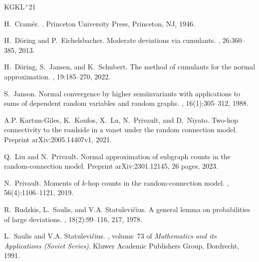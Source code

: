 \documentclass[12pt]{article}
\numberwithin{equation}{section}
\begin{document}
\newcommand{\etalchar}[1]{$^{#1}$}
\def\cprime{$'$} \def\polhk#1{\setbox0=\hbox{#1}{\ooalign{\hidewidth
  \lower1.5ex\hbox{`}\hidewidth\crcr\unhbox0}}}
  \def\polhk#1{\setbox0=\hbox{#1}{\ooalign{\hidewidth
  \lower1.5ex\hbox{`}\hidewidth\crcr\unhbox0}}} \def\cprime{$'$}
\begin{thebibliography}{KGKL{\etalchar{+}}21}

H.~Cram{\'e}r.
.
\newblock Princeton University Press, Princeton, NJ, 1946.

H.~D{\"{o}}ring and P.~Eichelsbacher.
\newblock Moderate deviations via cumulants.
, 26:360--385, 2013.

H.~D{\"o}ring, S.~Jansen, and K.~Schubert.
\newblock The method of cumulants for the normal approximation.
, 19:185--270, 2022.

S.~Janson.
\newblock Normal convergence by higher semiinvariants with applications to sums
  of dependent random variables and random graphs.
, 16(1):305--312, 1988.

\bibitem[KGKL{\etalchar{+}}21]{giles-privault2}
A.P. Kartun-Giles, K.~Koufos, X.~Lu, N.~Privault, and D.~Niyato.
\newblock Two-hop connectivity to the roadside in a vanet under the random
  connection model.
\newblock Preprint arXiv:2005.14407v1, 2021.

Q.~Liu and N.~Privault.
\newblock Normal approximation of subgraph counts in the random-connection
  model.
\newblock Preprint arXiv:2301.12145, 26 pages, 2023.

N.~Privault.
\newblock Moments of $k$-hop counts in the random-connection model.
, 56(4):1106--1121, 2019.

R.~Rudzkis, L.~Saulis, and V.A. Statulevi\v{c}ius.
\newblock A general lemma on probabilities of large deviations.
, 18(2):99--116, 217, 1978.

L.~Saulis and V.A. Statulevi\v{c}ius.
, volume~73 of {\em
  Mathematics and its Applications (Soviet Series)}.
\newblock Kluwer Academic Publishers Group, Dordrecht, 1991.

\end{thebibliography}
\end{document}

